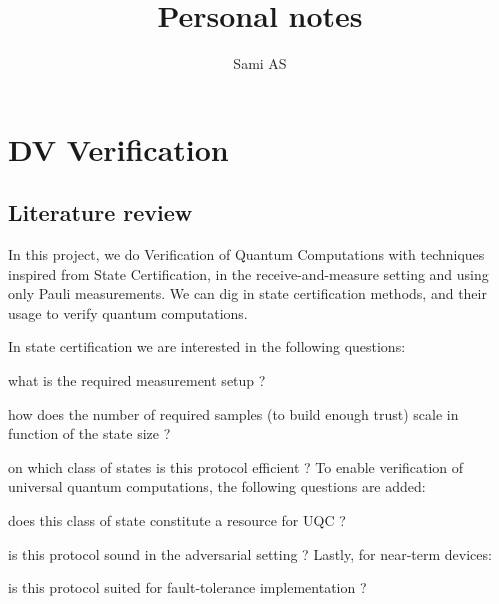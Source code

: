 \documentclass[11pt]{article}
\title{Personal notes}
\author{Sami AS}
\begin{document}
\maketitle
\section{DV Verification}
\subsection{Literature review}
In this project, we do Verification of Quantum Computations with techniques inspired from State Certification, in the receive-and-measure setting and using only Pauli measurements. We can dig in state certification methods, and their usage to verify quantum computations.

In state certification we are interested in the following questions: \begin{enumerate*}[label=\arabic*)]
    \item what is the required measurement setup ?
    \item how does the number of required samples (to build enough trust) scale in function of the state size ?
    \item on which class of states is this protocol efficient ?
    To enable verification of universal quantum computations, the following questions are added: 
    \item does this class of state constitute a resource for UQC ?
    \item is this protocol sound in the adversarial setting ?
    Lastly, for near-term devices:
    \item is this protocol suited for fault-tolerance implementation ?
\end{enumerate*}
\end{document}
